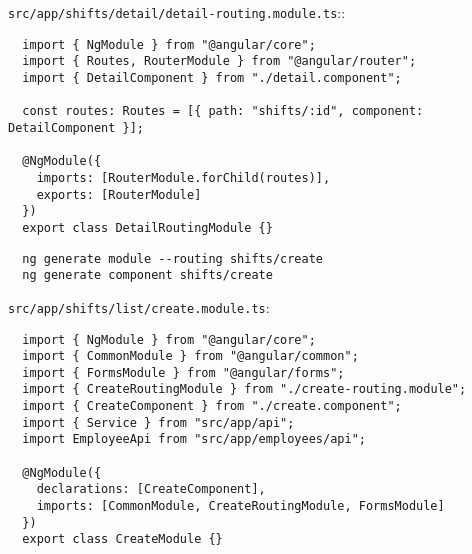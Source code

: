 \texttt{src/app/shifts/detail/detail-routing.module.ts}::
\begin{verbatim}
  import { NgModule } from "@angular/core";
  import { Routes, RouterModule } from "@angular/router";
  import { DetailComponent } from "./detail.component";

  const routes: Routes = [{ path: "shifts/:id", component: DetailComponent }];

  @NgModule({
    imports: [RouterModule.forChild(routes)],
    exports: [RouterModule]
  })
  export class DetailRoutingModule {}
\end{verbatim}

\begin{verbatim}
  ng generate module --routing shifts/create
  ng generate component shifts/create
\end{verbatim}

\texttt{src/app/shifts/list/create.module.ts}:
\begin{verbatim}
  import { NgModule } from "@angular/core";
  import { CommonModule } from "@angular/common";
  import { FormsModule } from "@angular/forms";
  import { CreateRoutingModule } from "./create-routing.module";
  import { CreateComponent } from "./create.component";
  import { Service } from "src/app/api";
  import EmployeeApi from "src/app/employees/api";

  @NgModule({
    declarations: [CreateComponent],
    imports: [CommonModule, CreateRoutingModule, FormsModule]
  })
  export class CreateModule {}
\end{verbatim}

